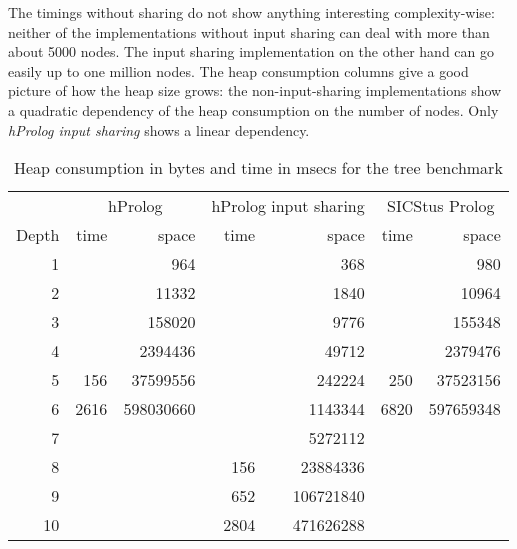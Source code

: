 \documentclass{tlp}
\begin{document}
The timings without sharing do not show anything interesting
complexity-wise: neither of the implementations without input sharing
can deal with more than about 5000 nodes. The input sharing
implementation on the other hand can go easily up to one million
nodes. The heap consumption columns give a good picture of how the
heap size grows: the non-input-sharing implementations show a
quadratic dependency of the heap consumption on the number of
nodes. Only {\em hProlog input sharing} shows a linear
dependency.

\begin{table}[ht]
\begin{center}
\begin{tabular}{|r||r|r||r|r||r|r|}
\hline
      & \multicolumn{2}{c||}{hProlog} & \multicolumn{2}{c||}{hProlog input sharing} & \multicolumn{2}{c|}{SICStus Prolog}\\
\cline{2-7}
Depth & time & space & time & space & time & space \\ 
\hline
1        &         &  964              &               & 368           &            &980       \\
2        &         &    11332          &               & 1840          &            &10964     \\
3        &         &    158020         &               & 9776          &            &155348    \\
4        &         &    2394436        &               & 49712         &            &2379476   \\
5        &    156  &    37599556       &               & 242224        &  250       &37523156  \\
6        &    2616 &    598030660      &               & 1143344       &  6820      &597659348 \\
7        &         &                   &               & 5272112       &            &          \\
8        &         &                   &  156          & 23884336      &            &          \\
9        &         &                   &  652          &106721840      &            &          \\
10       &         &                   &  2804         &471626288      &            &          \\
\hline
\end{tabular}
\caption{Heap consumption in bytes and time in msecs  for the tree
  benchmark}\label{treecombined}
\end{center}
\end{table}
\end{document}

